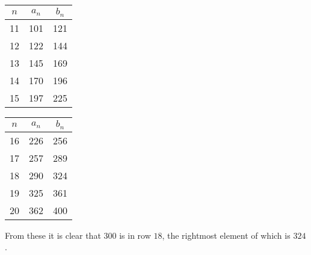 \documentclass{article}
\begin{document}
{\begin{multicols}{4}
    \begin{center}
      \begin{tabular}{c|cc}
        $n$ & $a_n$ & $b_n$ \\
        \hline
        11 & 101 & 121 \\
        12 & 122 & 144 \\
        13 & 145 & 169 \\
        14 & 170 & 196 \\
        15 & 197 & 225 \\
      \end{tabular}
    \end{center}
    \columnbreak

    \begin{center}
      \begin{tabular}{c|cc}
        $n$ & $a_n$ & $b_n$ \\
        \hline
        16 & 226 & 256 \\
        17 & 257 & 289 \\
        18 & 290 & 324 \\
        19 & 325 & 361 \\
        20 & 362 & 400 \\
      \end{tabular}
    \end{center}
  \end{multicols}
  
  From these it is clear that $300$ is in row $18$, the rightmost element of which is $324$.
}








\end{document}
